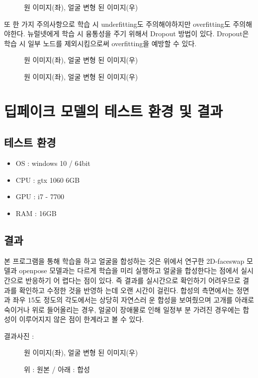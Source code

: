 \documentclass{oblivoir}
\newcommand{\spec}{
    \begin{itemize}
        \item OS : windows 10 / 64bit
        \item CPU : gtx 1060 6GB
        \item GPU : i7 - 7700
        \item RAM : 16GB
    \end{itemize}
    }
\begin{document}
\begin{figure}[h!]
\centering
\caption{원 이미지(좌), 얼굴 변형 된 이미지(우)}
\end{figure}

또 한 가지 주의사항으로 학습 시 underfitting도 주의해야하지만 overfitting도 주의해야한다. 뉴럴넷에게 학습 시 융통성을 주기 위해서 Dropout 방법이 있다. Dropout은 학습 시 일부 노드를 제외시킴으로써 overfitting을 예방할 수 있다.

\begin{figure}[h!]
\centering
\caption{원 이미지(좌), 얼굴 변형 된 이미지(우)}
\end{figure}

\begin{figure}[h!]
\centering
\caption{원 이미지(좌), 얼굴 변형 된 이미지(우)}
\end{figure}

\section{ 딥페이크 모델의 테스트 환경 및 결과}

\subsection{테스트 환경 }
\spec
\subsection{결과}

본 프로그램을 통해 학습을 하고 얼굴을 합성하는 것은 위에서 연구한 2D-faceswap 모델과  openpose 모델과는 다르게 학습을 미리 실행하고 얼굴을 합성한다는 점에서 실시간으로 반응하기 어 렵다는 점이 있다. 즉 결과를 실시간으로 확인하기 어려우므로 결과를 확인하고 수정한 것을 반영하 는데 오랜 시간이 걸린다. 합성의 측면에서는 정면과 좌우 15도 정도의 각도에서는 상당히 자연스러 운 합성을 보여줬으며 고개를 아래로 숙이거나 위로 들어올리는 경우, 얼굴이 장애물로 인해 일정부 분 가려진 경우에는 합성이 이루어지지 않은 점이 한계라고 볼 수 있다.

결과사진 :

\begin{figure}[h!]
\centering
\caption{원 이미지(좌), 얼굴 변형 된 이미지(우)}
\end{figure}

\begin{figure}[h!]
\centering
\caption{위 : 원본 / 아래 : 합성}
\end{figure}
\end{document}
